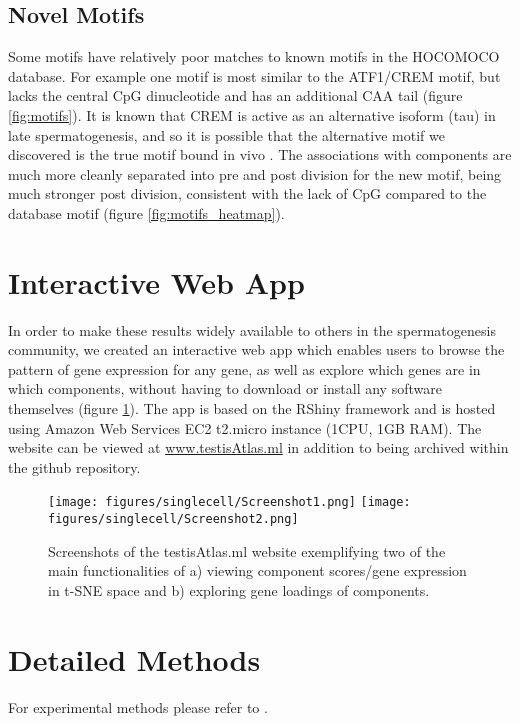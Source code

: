   
\subsection{Novel Motifs}

Some motifs have relatively poor matches to known motifs in the HOCOMOCO database.
For example one motif is most similar to the ATF1/CREM motif, but lacks the central CpG dinucleotide and has an additional CAA tail (figure \ref{fig:motifs}).
It is known that CREM is active as an alternative isoform (tau) in late spermatogenesis, and so it is possible that the alternative motif we discovered is the true motif bound in vivo \parencite{Sassone-Corsi2000CREM}.
The associations with components are much more cleanly separated into pre and post division for the new motif, being much stronger post division, consistent with the lack of CpG compared to the database motif (figure \ref{fig:motifs_heatmap}).



\section{Interactive Web App}
In order to make these results widely available to others in the spermatogenesis community, we created an interactive web app which enables users to browse the pattern of gene expression for any gene, as well as explore which genes are in which components, without having to download or install any software themselves (figure \ref{fig:shiny}).
The app is based on the RShiny framework and is hosted using Amazon Web Services EC2 t2.micro instance (1CPU, 1GB RAM).
The website can be viewed at \url{www.testisAtlas.ml} in addition to being archived within the github repository.

\begin{figure}[H]
	\centering
	\texttt{[image: figures/singlecell/Screenshot1.png]}
	\texttt{[image: figures/singlecell/Screenshot2.png]}
	\caption[Interactive Web Application]{
		Screenshots of the testisAtlas.ml website exemplifying two of the main functionalities of a) viewing component scores/gene expression in t-SNE space and b) exploring gene loadings of components.
	}
	\label{fig:shiny}
\end{figure}


\section{Detailed Methods}
For experimental methods please refer to \cite{Jung2019Unified}.

